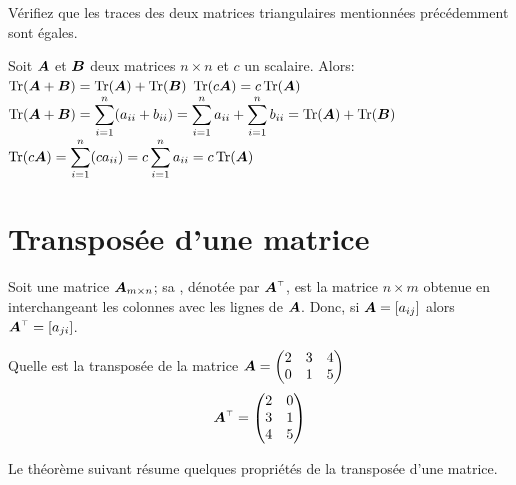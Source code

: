 \begin{exerciceB}
Vérifiez que les traces des deux matrices triangulaires mentionnées précédemment sont égales.
\end{exerciceB}

\begin{theo}
    Soit $\boldsymbol{A}$ et $\boldsymbol{B}$ deux matrices $n\times n$ et $c$ un scalaire.  Alors:
     $\operatorname{Tr}(\boldsymbol{A}+\boldsymbol{B}) = \operatorname{Tr}(\boldsymbol{A}) + \operatorname{Tr}(\boldsymbol{B})$
     $\operatorname{Tr}(c\boldsymbol{A}) = c\operatorname{Tr}(\boldsymbol{A})$
    \proof
     $\displaystyle
    \operatorname{Tr}(\boldsymbol{A}+\boldsymbol{B}) = \sum_{i=1}^n (a_{ii} + b_{ii})
    = \sum_{i=1}^n a_{ii} + \sum_{i=1}^n b_{ii} = \operatorname{Tr}(\boldsymbol{A}) + \operatorname{Tr}(\boldsymbol{B})
    $
     $\displaystyle \operatorname{Tr}(c\boldsymbol{A}) = \sum_{i=1}^n (c a_{ii})
    = c\sum_{i=1}^n a_{ii} = c\operatorname{Tr}(\boldsymbol{A})$ \cqfd
\end{theo}


\section{Transposée d'une matrice}
\begin{defini}
Soit une matrice $\boldsymbol{A}_{m\times n}$; sa , dénotée par $\transp{\matA}$,
est la matrice $n\times m$ obtenue en interchangeant les colonnes avec
les lignes de $\boldsymbol{A}$.  Donc, si $\boldsymbol{A} = [a_{ij}]$ alors $\transp{\matA} = [a_{ji}]$.
\end{defini}

\begin{exemple}
    Quelle est la transposée de la matrice $\displaystyle 
    \boldsymbol{A} = \begin{pmatrix}
        2 & 3 & 4 \\
        0 & 1 & 5
        \end{pmatrix}
    $
    \solution
    \[
    \transp{\matA} = \begin{pmatrix}
                2 & 0\\
                3 & 1 \\
                4 & 5
        \end{pmatrix}
    \]
\end{exemple}

Le théorème suivant résume quelques propriétés de la transposée d'une matrice.


